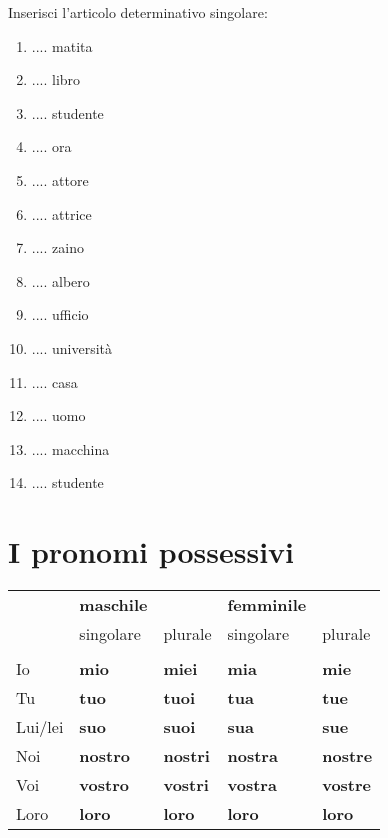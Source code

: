 \documentclass[letter,11pt]{article}
\newcommand{\myCode}[1]{\colorbox{gray!30}{#1}}
\begin{document}
\vskip 0.5in
\myCode{Inserisci l'articolo determinativo singolare: }

\begin{multicols}{2}
\begin{enumerate}
    \item .... matita
    \item .... libro
    \item .... studente
    \item .... ora
    \item .... attore
    \item .... attrice
    \item .... zaino
    \item .... albero
    \item .... ufficio
    \item .... università
    \item .... casa
    \item .... uomo
    \item .... macchina
    \item .... studente
\end{enumerate}
\end{multicols}

\vskip 0.5in
\section*{I pronomi possessivi}

\vskip 0.2in

\begin{tabular}{ |p{3cm}| p{2cm}| p{2cm}| p{2cm}| p{2cm}| }
    & {\bf maschile} & & {\bf femminile} &  \\
    & singolare & plurale & singolare & plurale  \\
    \hline
    \hline
    & & & & \\ \hline
    Io   &  {\bf mio} & {\bf miei} & {\bf mia} & {\bf mie}  \\ \hline
    Tu   &  {\bf tuo} & {\bf tuoi} & {\bf tua} & {\bf tue}  \\ \hline
    Lui/lei &  {\bf suo} & {\bf suoi} & {\bf sua} & {\bf sue}  \\ \hline
    Noi  &  {\bf nostro} & {\bf nostri} & {\bf nostra} & {\bf nostre}  \\ \hline
    Voi  &  {\bf vostro} & {\bf vostri} & {\bf vostra} & {\bf vostre}  \\ \hline
    Loro &  {\bf loro} & {\bf loro} & {\bf loro} & {\bf loro}  \\ \hline
    \hline

\end{tabular}
\end{document}
